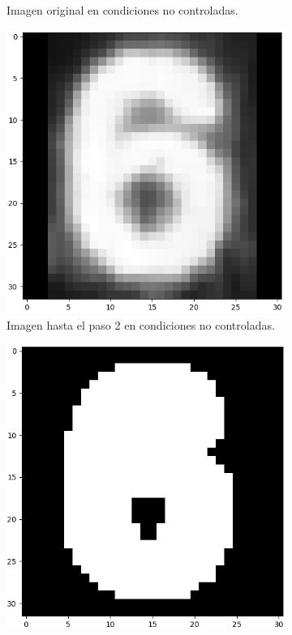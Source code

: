 \begin{figure}[hp!]
\begin{subfigure}[t]{0.3\textwidth}
        \caption{Imagen original en condiciones no controladas.}
    \end{subfigure}
    \hfill
    \begin{subfigure}[t]{0.3\textwidth}
        \centering
        \includegraphics[height=\x1cm]{3_Reconocimiento/Figs/test_sample6_bad_padded1}
        \caption{Imagen hasta el paso 2 en condiciones no controladas.}
    \end{subfigure}
    \hfill
    \begin{subfigure}[t]{0.3\textwidth}
        \centering
        \includegraphics[height=\x1cm]{3_Reconocimiento/Figs/test_sample6_bad_otsu1}

\end{subfigure}
\end{figure}
